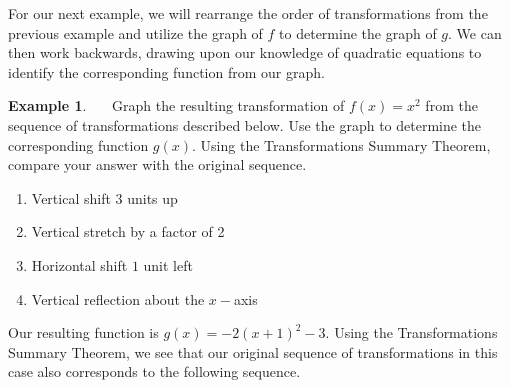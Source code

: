 \documentclass[11pt]{book}
\theoremstyle{definition}  %
\newtheorem{example}{Example}[chapter]
\begin{document}
For our next example, we will rearrange the order of transformations from the previous example and utilize the graph of $f$ to determine the graph of $g$.  We can then work backwards, drawing upon our knowledge of quadratic equations to identify the corresponding function from our graph.


\begin{example}~~~Graph the resulting transformation of $f(x)=x^2$ from the sequence of transformations described below.  Use the graph to determine the corresponding function $g(x)$.  Using the Transformations Summary Theorem, compare your answer with the original sequence.
\begin{center}
\begin{enumerate}
	\item Vertical shift $3$ units up
	\item Vertical stretch by a factor of 2
	\item Horizontal shift $1$ unit left
	\item Vertical reflection about the $x-$axis
\end{enumerate}
\end{center}

\newpage
\begin{center}
\end{center}

Our resulting function is $g(x)=-2(x+1)^2-3$.  Using the Transformations Summary Theorem, we see that our original sequence of transformations in this case also corresponds to the following sequence.


\end{example}
\end{document}
